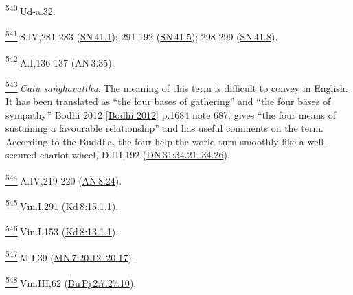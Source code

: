 \label{footprints_split_025.html_fn540}
\hyperref[footprints_split_014.htmlux5cux23fnref540]{\textsuperscript{540}} Ud-a.32.

\label{footprints_split_025.html_fn541}
\hyperref[footprints_split_014.htmlux5cux23fnref541]{\textsuperscript{541}} S.IV,281-283
(\href{https://suttacentral.net/sn41.1/en/sujato}{SN\,41.1}); 291-192
(\href{https://suttacentral.net/sn41.5/en/sujato}{SN\,41.5}); 298-299
(\href{https://suttacentral.net/sn41.8/en/sujato}{SN\,41.8}).

\label{footprints_split_025.html_fn542}
\hyperref[footprints_split_014.htmlux5cux23fnref542]{\textsuperscript{542}} A.I,136-137
(\href{https://suttacentral.net/an3.35/en/sujato}{AN\,3.35}).

\label{footprints_split_025.html_fn543}
\hyperref[footprints_split_014.htmlux5cux23fnref543]{\textsuperscript{543}} \emph{Catu
saṅghavatthu}. The meaning of this term is difficult to convey in
English. It has been translated as ``the four bases of gathering'' and
``the four bases of sympathy.'' {Bodhi 2012
{{[}\hyperref[footprints_split_022.htmlux5cux23Bodhiux5cux25202012]{Bodhi
2012}{]}}} p.1684 note 687, gives ``the four means of sustaining a
favourable relationship'' and has useful comments on the term. According
to the Buddha, the four help the world turn smoothly like a well-secured
chariot wheel, D.III,192
(\href{https://suttacentral.net/dn31/en/sujato\#34.21}{DN\,31:34.21--34.26}).

\label{footprints_split_025.html_fn544}
\hyperref[footprints_split_014.htmlux5cux23fnref544]{\textsuperscript{544}} A.IV,219-220
(\href{https://suttacentral.net/an8.24/en/sujato}{AN\,8.24}).

\label{footprints_split_025.html_fn545}
\hyperref[footprints_split_014.htmlux5cux23fnref545]{\textsuperscript{545}} Vin.I,291
(\href{https://suttacentral.net/pli-tv-kd8/en/brahmali\#15.1.1}{Kd\,8:15.1.1}).

\label{footprints_split_025.html_fn546}
\hyperref[footprints_split_014.htmlux5cux23fnref546]{\textsuperscript{546}} Vin.I,153
(\href{https://suttacentral.net/pli-tv-kd3/en/brahmali\#13.1.1}{Kd\,8:13.1.1}).

\label{footprints_split_025.html_fn547}
\hyperref[footprints_split_014.htmlux5cux23fnref547]{\textsuperscript{547}} M.I,39
(\href{https://suttacentral.net/mn7/en/sujato\#20.12}{MN\,7:20.12--20.17}).

\label{footprints_split_025.html_fn548}
\hyperref[footprints_split_014.htmlux5cux23fnref548]{\textsuperscript{548}} Vin.III,62
(\href{https://suttacentral.net/pli-tv-bu-vb-pj2/en/brahmali\#7.27.10}{Bu\,Pj\,2:7.27.10}).


